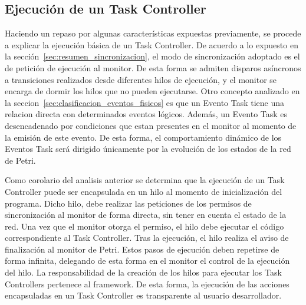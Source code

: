 \subsection{Ejecución de un Task Controller}
Haciendo un repaso por algunas características expuestas previamente, se procede
a explicar la ejecución básica de un Task Controller.
De acuerdo a lo expuesto en la sección~\ref{sec:resumen_sincronizacion}, el 
modo de sincronización adoptado es el de petición de ejecución al monitor. 
De esta forma se admiten disparos asíncronos a transiciones realizados desde
diferentes hilos de ejecución, y el monitor se encarga de dormir los hilos que no pueden
ejecutarse.
Otro concepto analizado en la seccion~\ref{sec:clasificacion_eventos_fisicos}
es que un Evento Task tiene una
relacion directa con determinados eventos lógicos. Además, un Evento Task es
desencadenado por condiciones que estan presentes en el monitor al momento de
la emisión de este evento. De esta forma, el comportamiento dinámico de los
Eventos Task será dirigido únicamente por la evolución de los estados de la red
de Petri.

Como corolario del analisis anterior se determina que la ejecución de un Task
Controller puede ser encapsulada en un hilo al momento de inicialización del programa.
Dicho hilo, debe realizar las peticiones de los permisos de sincronización al
monitor de forma directa, sin tener en cuenta el estado de la red. Una vez que
el monitor otorga el permiso, el hilo debe ejecutar el código correspondiente al
Task Controller. Tras la ejecución, el hilo realiza el aviso de finalización al
monitor de Petri.
Estos pasos de ejecución deben repetirse de forma infinita, delegando de esta
forma en el monitor el control de la ejecución del hilo.
La responsabilidad de la creación de los hilos para ejecutar los Task
Controllers pertenece al framework. De esta forma, la ejecución de las
acciones encapsuladas en un Task Controller es transparente al usuario
desarrollador.

